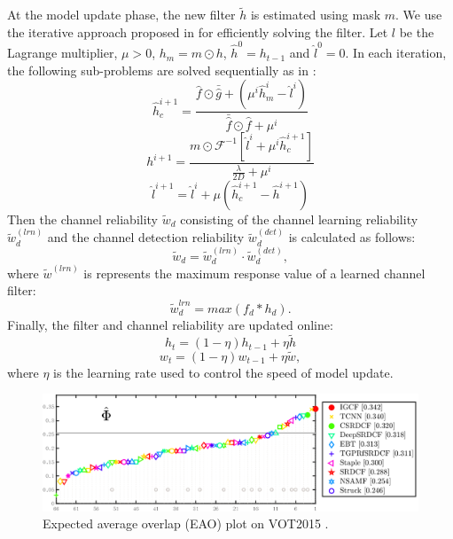 \documentclass[review]{elsarticle}
\begin{document}
\begin{CJK*}{UTF8}{gbsn}
At the model update phase, the new filter $\tilde{h}$ is estimated using mask $m$. We use the iterative approach proposed in \cite{Lukezic2017DiscriminativeCF} for efficiently solving the filter. Let $l$ be the Lagrange multiplier, $\mu > 0$, $h_m=m \odot h$, $\hat{h}^0 = h_{t-1}$ and $\hat{l}^0 = 0$. In each iteration, the following sub-problems are solved sequentially as in \cite{Lukezic2017DiscriminativeCF}:
\begin{equation} \label{eq:h1}
\hat{h}_c^{i+1} = \frac{\hat{f} \odot \bar{\hat{g}} +(\mu^i \hat{h}_m^i - \hat{l}^i)}{\bar{\hat{f}} \odot \hat f + \mu^i}
\end{equation}
\begin{equation}
h^{i+1} = \frac{m \odot \mathcal{F}^{-1}[\hat{l}^i + \mu^i\hat{h}_c^{i+1}]}{\frac{\lambda}{2D} + \mu^i}
\end{equation}
\begin{equation} \label{eq:h3}
\hat{l}^{i+1} = \hat{l}^i + \mu(\hat{h}_c^{i+1} - \hat{h}^{i+1})
\end{equation}
Then the channel reliability $\tilde w_d$ \cite{Lukezic2017DiscriminativeCF} consisting of the channel learning reliability $\tilde w_d^{(lrn)}$ and the channel detection reliability $\tilde w_d^{(det)}$ is calculated as follows: 
\begin{equation} \label{eq:c}
\tilde w_d = \tilde w_d^{(lrn)} \cdot \tilde w_d^{(det)},
\end{equation}
where $\tilde{w}^{(lrn)}$ is represents the maximum response value of a learned channel filter:
\begin{equation} \label{eq:lrn}
\tilde{w}_d^{lrn} = max(f_d * h_d).
\end{equation}
Finally, the filter and channel reliability are updated online:
\begin{equation} \label{eq:update1}
h_t = (1 - \eta)h_{t-1} + \eta \tilde{h}
\end{equation}
\begin{equation} \label{eq:update2}
w_t = (1-\eta)w_{t-1} + \eta \tilde{w},
\end{equation}
where $\eta$ is the learning rate used to control the speed of model update.

\begin{figure}
    \centering
    \includegraphics[width=12cm]{images/vot/eao_rank_vot2015.png}
    \caption{Expected average overlap (EAO) plot on VOT2015 \cite{Kristan2015TheVO}.}
    \label{fig:vot15}
\end{figure}


\end{CJK*}
\end{document}
